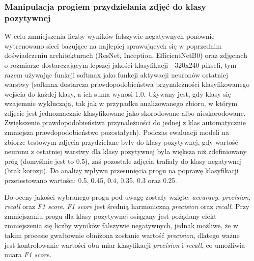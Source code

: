 \documentclass[polish,12pt]{aghthesis}
\begin{document}
\subsubsection{Manipulacja progiem przydzielania zdjęć do klasy pozytywnej}
\par\noindent  
W celu zmniejszenia liczby wyników fałszywie negatywnych ponownie wytrenowano sieci bazujące na najlepiej sprawujących się w poprzednim doświadczeniu architekturach (ResNet, Inception, EfficientNetB0) oraz zdjęciach o rozmiarze dostarczającym lepszej jakości klasyfikacji - 320x240 pikseli, tym razem używając funkcji softmax jako funkcji aktywacji neuronów ostatniej warstwy (softmax dostarcza prawdopodobieństwa przynależności klasyfikowanego wejścia do każdej klasy, a ich suma wynosi 1.0. Używany jest, gdy klasy się wzajemnie wykluczają, tak jak w przypadku analizowanego zbioru, w którym zdjęcie jest jednoznacznie klasyfikowane jako skorodowane albo nieskorodowane. Zwiększenie prawdopodobieństwa przynależności do jednej z klas automatycznie zmniejsza prawdopodobieństwo pozostałych). Podczas ewaluacji modeli na zbiorze testowym zdjęcia przydzielane były do klasy pozytywnej, gdy wartość neuronu z ostatniej warstwy dla klasy pozytywnej była większa niż zdefiniowany próg (domyślnie jest to 0.5), zaś pozostałe zdjęcia trafiały do klasy negatywnej (brak korozji). Do analizy wpływu przesunięcia progu na poprawę klasyfikacji przetestowano wartości: 0.5, 0.45, 0.4, 0.35, 0.3 oraz 0.25.

Do oceny jakości wybranego progu pod uwagę zostały wzięte: \textit{accuracy}, \textit{precision}, \textit{recall} oraz \textit{F1 score}. \textit{F1 score} jest średnią harmoniczną \textit{precision} oraz \textit{recall}. Przy zmniejszaniu progu dla klasy pozytywnej osiągany jest pożądany efekt zmniejszenia się liczby wyników fałszywie negatywnych, jednak możliwe, że w takim procesie gwałtownie obniżona zostanie wartość \textit{precision}, dlatego ważne jest kontrolowanie wartości obu miar klasyfikacji \textit{precision} i \textit{recall}, co umożliwia miara \textit{F1 score}.
\end{document}
